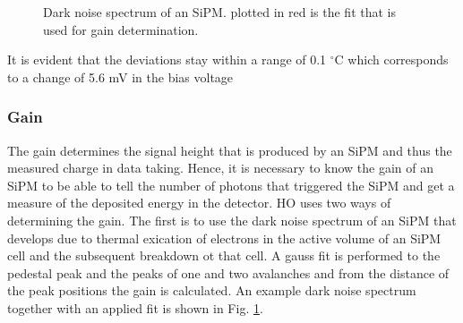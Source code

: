 \begin{figure}[h]
\begin{minipage}[t]{0.455\textwidth}
\caption{Dark noise spectrum of an SiPM. plotted in red is the fit that is used for gain determination.}
\label{darkNoise}
\end{minipage}
\end{figure}
It is evident that the deviations stay within a range of 0.1 $^\circ$C which corresponds to a change of 5.6 mV in the bias voltage

\subsubsection{Gain}
The gain determines the signal height that is produced by an SiPM and thus the measured charge in data taking. Hence, it is necessary to know the gain of an SiPM to be able to tell the number of photons that triggered the SiPM and get a measure of the deposited energy in the detector. HO uses two ways of determining the gain.
The first is to use the dark noise spectrum of an SiPM that develops due to thermal exication of electrons in the active volume of an SiPM cell and the subsequent breakdown ot that cell. A gauss fit is performed to the pedestal peak and the peaks of one and two avalanches and from the distance of the peak positions the gain is calculated. An example dark noise spectrum together with an applied fit is shown in Fig. \ref{darkNoise}.
